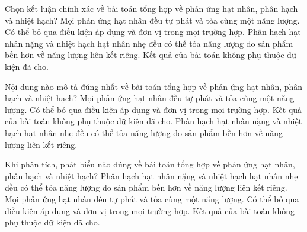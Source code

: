\begin{ex}
Chọn kết luận chính xác về bài toán tổng hợp về phản ứng hạt nhân, phân hạch và nhiệt hạch?
\choice
{Mọi phản ứng hạt nhân đều tự phát và tỏa cùng một năng lượng.}
{Có thể bỏ qua điều kiện áp dụng và đơn vị trong mọi trường hợp.}
{\True Phân hạch hạt nhân nặng và nhiệt hạch hạt nhân nhẹ đều có thể tỏa năng lượng do sản phẩm bền hơn về năng lượng liên kết riêng.}
{Kết quả của bài toán không phụ thuộc dữ kiện đã cho.}
\end{ex}

\begin{ex}
Nội dung nào mô tả đúng nhất về bài toán tổng hợp về phản ứng hạt nhân, phân hạch và nhiệt hạch?
\choice
{Mọi phản ứng hạt nhân đều tự phát và tỏa cùng một năng lượng.}
{Có thể bỏ qua điều kiện áp dụng và đơn vị trong mọi trường hợp.}
{Kết quả của bài toán không phụ thuộc dữ kiện đã cho.}
{\True Phân hạch hạt nhân nặng và nhiệt hạch hạt nhân nhẹ đều có thể tỏa năng lượng do sản phẩm bền hơn về năng lượng liên kết riêng.}
\end{ex}

\begin{ex}
Khi phân tích, phát biểu nào đúng về bài toán tổng hợp về phản ứng hạt nhân, phân hạch và nhiệt hạch?
\choice
{\True Phân hạch hạt nhân nặng và nhiệt hạch hạt nhân nhẹ đều có thể tỏa năng lượng do sản phẩm bền hơn về năng lượng liên kết riêng.}
{Mọi phản ứng hạt nhân đều tự phát và tỏa cùng một năng lượng.}
{Có thể bỏ qua điều kiện áp dụng và đơn vị trong mọi trường hợp.}
{Kết quả của bài toán không phụ thuộc dữ kiện đã cho.}
\end{ex}

